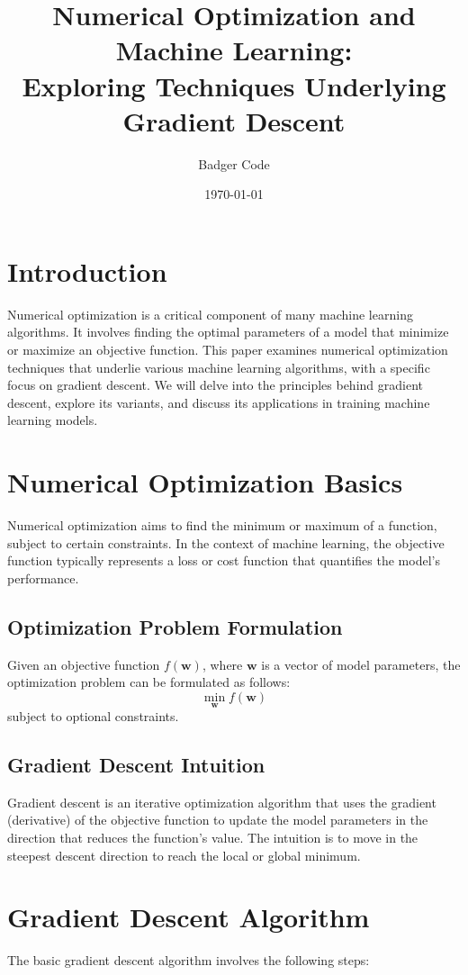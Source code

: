 \documentclass{article}
\title{Numerical Optimization and Machine Learning: \\
       Exploring Techniques Underlying Gradient Descent}
\author{Badger Code}
\date{\today}
\begin{document}
\maketitle

\section{Introduction}
Numerical optimization is a critical component of many machine learning algorithms. It involves finding the optimal parameters of a model that minimize or maximize an objective function. This paper examines numerical optimization techniques that underlie various machine learning algorithms, with a specific focus on gradient descent. We will delve into the principles behind gradient descent, explore its variants, and discuss its applications in training machine learning models.

\section{Numerical Optimization Basics}
Numerical optimization aims to find the minimum or maximum of a function, subject to certain constraints. In the context of machine learning, the objective function typically represents a loss or cost function that quantifies the model's performance.

\subsection{Optimization Problem Formulation}
Given an objective function $f(\mathbf{w})$, where $\mathbf{w}$ is a vector of model parameters, the optimization problem can be formulated as follows:
\[ \min_{\mathbf{w}} f(\mathbf{w}) \]
subject to optional constraints.

\subsection{Gradient Descent Intuition}
Gradient descent is an iterative optimization algorithm that uses the gradient (derivative) of the objective function to update the model parameters in the direction that reduces the function's value. The intuition is to move in the steepest descent direction to reach the local or global minimum.

\section{Gradient Descent Algorithm}
The basic gradient descent algorithm involves the following steps:
\end{document}
